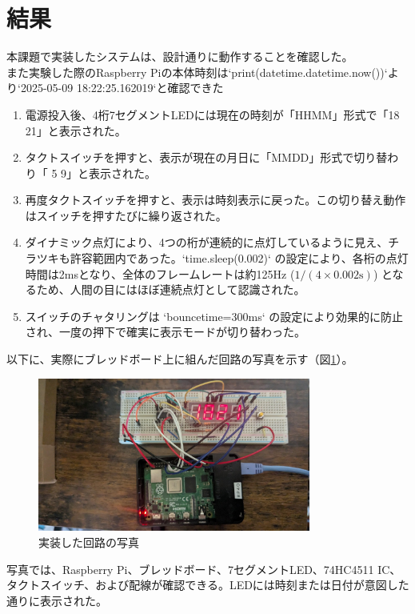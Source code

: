 \documentclass[a4paper,11pt,dvipdfmx]{jsarticle}
\begin{document}
\section{結果}
本課題で実装したシステムは、設計通りに動作することを確認した。\\
また実験した際のRaspberry Piの本体時刻は`print(datetime.datetime.now())`より`2025-05-09 18:22:25.162019`と確認できた  
\begin{enumerate}
    \item 電源投入後、4桁7セグメントLEDには現在の時刻が「HHMM」形式で「18 21」と表示された。
    \item タクトスイッチを押すと、表示が現在の月日に「MMDD」形式で切り替わり「 5  9」と表示された。
    \item 再度タクトスイッチを押すと、表示は時刻表示に戻った。この切り替え動作はスイッチを押すたびに繰り返された。
    \item ダイナミック点灯により、4つの桁が連続的に点灯しているように見え、チラツキも許容範囲内であった。`time.sleep(0.002)` の設定により、各桁の点灯時間は2msとなり、全体のフレームレートは約125Hz ($1 / (4 \times 0.002\text{s})$) となるため、人間の目にはほぼ連続点灯として認識された。
    \item スイッチのチャタリングは `bouncetime=300ms` の設定により効果的に防止され、一度の押下で確実に表示モードが切り替わった。
\end{enumerate}
以下に、実際にブレッドボード上に組んだ回路の写真を示す（図\ref{fig:circuit_photo_exam8}）。
\begin{figure}[htbp]
\centering
\includegraphics[width=0.8\textwidth]{image.png}
\caption{実装した回路の写真}
\label{fig:circuit_photo_exam8}
\end{figure}
写真では、Raspberry Pi、ブレッドボード、7セグメントLED、74HC4511 IC、タクトスイッチ、および配線が確認できる。LEDには時刻または日付が意図した通りに表示された。
\end{document}
